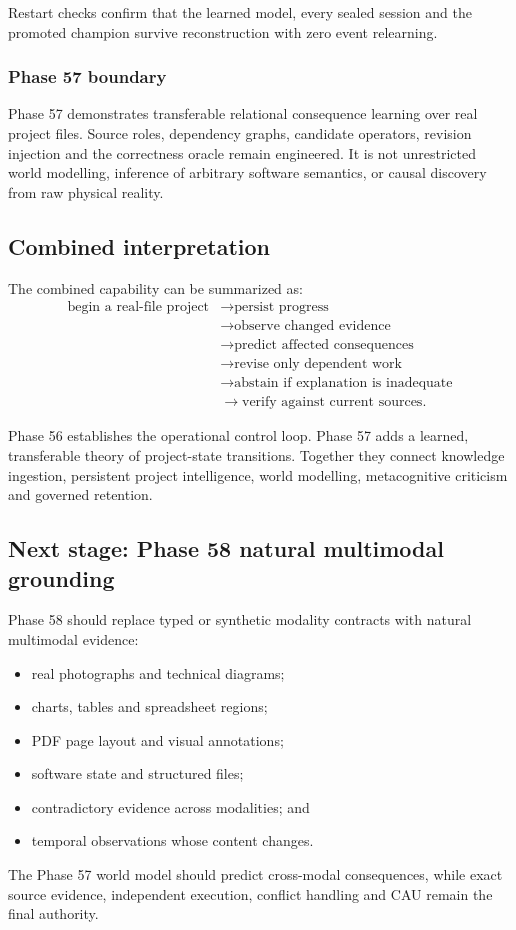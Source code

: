 Restart checks confirm that the learned model, every sealed session and the
promoted champion survive reconstruction with zero event relearning.

\subsubsection{Phase 57 boundary}

Phase 57 demonstrates transferable relational consequence learning over real
project files.  Source roles, dependency graphs, candidate operators,
revision injection and the correctness oracle remain engineered.  It is not
unrestricted world modelling, inference of arbitrary software semantics, or
causal discovery from raw physical reality.

\subsection{Combined interpretation}

The combined capability can be summarized as:
\[
\begin{aligned}
\text{begin a real-file project}
&\rightarrow \text{persist progress}\\
&\rightarrow \text{observe changed evidence}\\
&\rightarrow \text{predict affected consequences}\\
&\rightarrow \text{revise only dependent work}\\
&\rightarrow \text{abstain if explanation is inadequate}\\
&\rightarrow \text{verify against current sources}.
\end{aligned}
\]

Phase 56 establishes the operational control loop.  Phase 57 adds a learned,
transferable theory of project-state transitions.  Together they connect
knowledge ingestion, persistent project intelligence, world modelling,
metacognitive criticism and governed retention.

\subsection{Next stage: Phase 58 natural multimodal grounding}

Phase 58 should replace typed or synthetic modality contracts with natural
multimodal evidence:
\begin{itemize}
    \item real photographs and technical diagrams;
    \item charts, tables and spreadsheet regions;
    \item PDF page layout and visual annotations;
    \item software state and structured files;
    \item contradictory evidence across modalities; and
    \item temporal observations whose content changes.
\end{itemize}

The Phase 57 world model should predict cross-modal consequences, while exact
source evidence, independent execution, conflict handling and CAU remain the
final authority.
